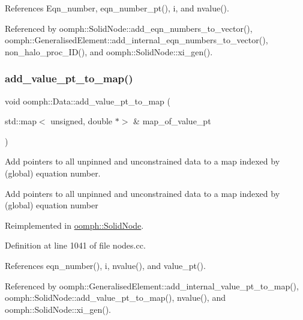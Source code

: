 References Eqn\+\_\+number, eqn\+\_\+number\+\_\+pt(), i, and nvalue().



Referenced by oomph\+::\+Solid\+Node\+::add\+\_\+eqn\+\_\+numbers\+\_\+to\+\_\+vector(), oomph\+::\+Generalised\+Element\+::add\+\_\+internal\+\_\+eqn\+\_\+numbers\+\_\+to\+\_\+vector(), non\+\_\+halo\+\_\+proc\+\_\+\+I\+D(), and oomph\+::\+Solid\+Node\+::xi\+\_\+gen().

\mbox{\label{classoomph_1_1Data_aa4edecf3e781a28427a53a79dd062e39}} 
\subsubsection{\texorpdfstring{add\+\_\+value\+\_\+pt\+\_\+to\+\_\+map()}{add\_value\_pt\_to\_map()}}
{\footnotesize\ttfamily void oomph\+::\+Data\+::add\+\_\+value\+\_\+pt\+\_\+to\+\_\+map (\begin{DoxyParamCaption}\item[{std\+::map$<$ unsigned, double $\ast$$>$ \&}]{map\+\_\+of\+\_\+value\+\_\+pt }\end{DoxyParamCaption})\hspace{0.3cm}{\ttfamily [virtual]}}



Add pointers to all unpinned and unconstrained data to a map indexed by (global) equation number. 

Add pointers to all unpinned and unconstrained data to a map indexed by (global) equation number 

Reimplemented in \hyperlink{classoomph_1_1SolidNode_a0c4a46d5a85e2a6d063c127b3df07058}{oomph\+::\+Solid\+Node}.



Definition at line 1041 of file nodes.\+cc.



References eqn\+\_\+number(), i, nvalue(), and value\+\_\+pt().



Referenced by oomph\+::\+Generalised\+Element\+::add\+\_\+internal\+\_\+value\+\_\+pt\+\_\+to\+\_\+map(), oomph\+::\+Solid\+Node\+::add\+\_\+value\+\_\+pt\+\_\+to\+\_\+map(), nvalue(), and oomph\+::\+Solid\+Node\+::xi\+\_\+gen().

